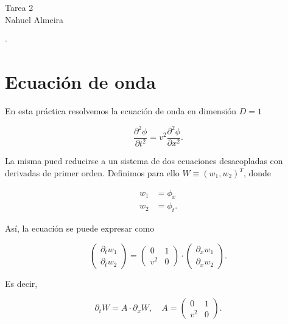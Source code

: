 \documentclass[12pt]{article}
\begin{document}

\begin{center}
    Tarea 2 \\
    Nahuel Almeira
\end{center}

\begin{center}
    \Large - \normalsize
\end{center}

\section{Ecuaci\'on de onda}

En esta pr\'actica resolvemos la ecuaci\'on de onda en dimensi\'on $D = 1$

\begin{equation}
\dfrac{\partial^2 \phi}{\partial t^2} = v^2 \dfrac{\partial^2 \phi}{\partial x^2}.
\end{equation}

La misma pued reducirse a un sistema de dos ecuaciones desacopladas con derivadas de primer orden. Definimos para ello $W \equiv (w_1, w_2)^T$, donde

\begin{align}
w_1 &= \phi_x \\
w_2 &= \phi_t.
\end{align}

As\'i, la ecuaci\'on se puede expresar como

\begin{equation}
\begin{pmatrix}
\partial_t w_1 \\
\partial_t w_2
\end{pmatrix} = 
\begin{pmatrix}
0 & 1 \\
v^2 & 0
\end{pmatrix} \cdot
\begin{pmatrix}
\partial_x w_1 \\
\partial_x w_2
\end{pmatrix}.
\end{equation}

Es decir,

\begin{equation} \label{eq:wave_1d_system}
\partial_t W = A \cdot \partial_x W,\quad 
A = \begin{pmatrix}
0 & 1 \\
v^2 & 0
\end{pmatrix}.
\end{equation}
\end{document}

